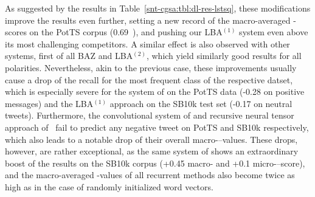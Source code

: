 As suggested by the results in Table~\ref{snt-cgsa:tbl:dl-res-lstsq},
these modifications improve the results even further, setting a new
record of the macro-averaged \F-scores on the PotTS corpus (0.69~\F),
and pushing our LBA$^{(1)}$ system even above its most challenging
competitors.  A similar effect is also observed with other systems,
first of all BAZ and LBA$^{(2)}$, which yield similarly good results
for all polarities.  Nevertheless, akin to the previous case, these
improvements usually cause a drop of the recall for the most frequent
class of the respective datset, which is especially severe for the
system of \citeauthor{Baziotis:17} on the PotTS data (-0.28 on
positive messages) and the LBA$^{(1)}$ approach on the SB10k test set
(-0.17 on neutral tweets).  Furthermore, the convolutional system of
\citeauthor{Severyn:15} and recursive neural tensor approach
of~\citet{Socher:13} fail to predict any negative tweet on PotTS and
SB10k respectively, which also leads to a notable drop of their
overall macro-\F--values.  These drops, however, are rather
exceptional, as the same system of \citeauthor{Severyn:15} shows an
extraordinary boost of the results on the SB10k corpus (+0.45
macro-\F{} and +0.1 micro-\F--score), and the macro-averaged \F-values
of all recurrent methods also become twice as high as in the case of
randomly initialized word vectors.

